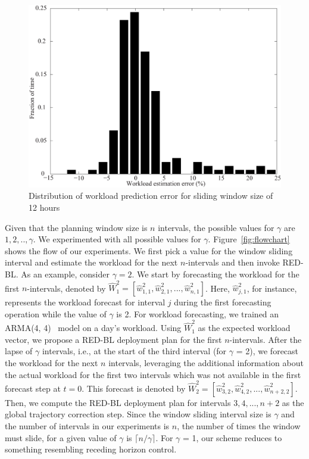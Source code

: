 \begin{figure}
\centering
\includegraphics[width=0.7\linewidth]{pics/workload-pred-error-2.eps}
    \caption{Distribution of workload prediction error for sliding window size of 12 hours}
    \label{fig:workload-pred-error-dist}
    \end{figure}
    
    Given that the planning window size is $n$ intervals, the possible values for $\gamma$ are $1, 2, .., \gamma$. We experimented with all possible values for $\gamma$. Figure~\ref{fig:flowchart} shows the flow of our experiments. We first pick a value for the window sliding interval and estimate the workload for the next $n$-intervals and then invoke RED-BL. As an example, consider $\gamma=2$. We start by forecasting the workload for the first $n$-intervals, denoted by $\hat{W}_1^2 = [\hat{w}_{1,1}^2, \hat{w}_{2,1}^2, ..., \hat{w}_{n,1}^2]$. Here, $\hat{w}_{j,1}^2$, for instance, represents the workload forecast for interval $j$ during the first forecasting operation while the value of $\gamma$ is 2. For workload forecasting, we trained an ARMA(4, 4)~\cite{arma} model on a day's workload. Using $\hat{W}^2_1$ as the expected workload vector, we propose a RED-BL deployment plan for the first $n$-intervals. After the lapse of $\gamma$ intervals, i.e., at the start of the third interval (for $\gamma$ = 2), we forecast the workload for the next $n$ intervals, leveraging the additional information about the actual workload for the first two intervals which was not available in the first forecast step at $t=0$. This forecast is denoted by $\hat{W}_2^2 = [\hat{w}_{3,2}^2, \hat{w}_{4,2}^2, ..., \hat{w}_{n+2,2}^2]$. Then, we compute the RED-BL deployment plan for intervals $3, 4,..., n+2$ as the global trajectory correction step. Since the window sliding interval size is $\gamma$ and the number of intervals in our experiments is $n$, the number of times the window must slide, for a given value of $\gamma$ is $\lceil n/\gamma \rceil$. For $\gamma$ = 1, our scheme reduces to something resembling receding horizon control.
    

